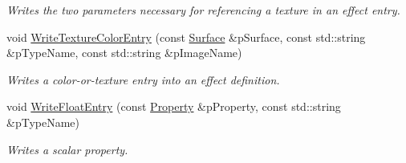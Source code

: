 \begin{DoxyCompactItemize}
\begin{DoxyCompactList}\small\item\em Writes the two parameters necessary for referencing a texture in an effect entry. \end{DoxyCompactList}\item 
\hypertarget{class_assimp_1_1_collada_exporter_ac89483b8237a8eda300dec453cf9235c}{void \hyperlink{class_assimp_1_1_collada_exporter_ac89483b8237a8eda300dec453cf9235c}{Write\+Texture\+Color\+Entry} (const \hyperlink{struct_assimp_1_1_collada_exporter_1_1_surface}{Surface} \&p\+Surface, const std\+::string \&p\+Type\+Name, const std\+::string \&p\+Image\+Name)}\label{class_assimp_1_1_collada_exporter_ac89483b8237a8eda300dec453cf9235c}

\begin{DoxyCompactList}\small\item\em Writes a color-\/or-\/texture entry into an effect definition. \end{DoxyCompactList}\item 
\hypertarget{class_assimp_1_1_collada_exporter_a97ac40c550e298ff0f96ad24976b851a}{void \hyperlink{class_assimp_1_1_collada_exporter_a97ac40c550e298ff0f96ad24976b851a}{Write\+Float\+Entry} (const \hyperlink{struct_assimp_1_1_collada_exporter_1_1_property}{Property} \&p\+Property, const std\+::string \&p\+Type\+Name)}\label{class_assimp_1_1_collada_exporter_a97ac40c550e298ff0f96ad24976b851a}

\begin{DoxyCompactList}\small\item\em Writes a scalar property. \end{DoxyCompactList}\end{DoxyCompactItemize}
